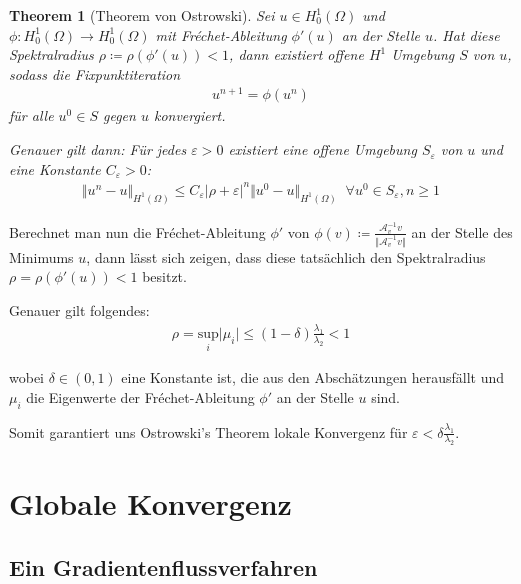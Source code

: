 \documentclass[final,bibliography=totocnumbered]{include/seminar}
\newcommand{\Hone}{\ensuremath{{H^1(\Omega)}}}
\newcommand{\Honez}{\ensuremath{{H^1_0(\Omega)}}}
\newcommand{\mAi}{\ensuremath{\mathcal{A}}^{-1}}
\theoremstyle{break}
\newtheorem{theorem}{Theorem}[section]
\begin{document}
\begin{theorem}[Theorem von Ostrowski]
    Sei $u \in \Honez$ und $\phi: \Honez \rightarrow \Honez$ mit Fréchet-Ableitung $\phi'(u)$ an der Stelle $u$.
    Hat diese Spektralradius $\rho \coloneq \rho(\phi'(u)) < 1$,
    dann existiert offene $H^1$ Umgebung $S$ von $u$, sodass die Fixpunktiteration
    \begin{align*}
        u^{n+1} = \phi(u^n)
    \end{align*}
    für alle $u^0 \in S$ gegen $u$ konvergiert.

    \medskip

    Genauer gilt dann: Für jedes $\varepsilon > 0$ existiert eine offene
    Umgebung $S_\varepsilon$ von $u$ und eine Konstante $C_\varepsilon > 0$:
    \begin{align*}
        \Vert u^n - u \Vert_\Hone \leq C_\varepsilon \vert \rho + \varepsilon \vert^n \Vert u^0 - u \Vert_\Hone\;\; \forall u^0 \in S_\varepsilon, n \geq 1
    \end{align*}
\end{theorem}
\cite{ostrowski-original}
\cite{ostrowski-improved}

\medskip

Berechnet man nun die Fréchet-Ableitung $\phi'$ von
$\phi(v) \coloneq \frac{\mAi_v v}{\Vert \mAi_v v \Vert}$ an der Stelle
des Minimums $u$, dann lässt sich zeigen,
dass diese tatsächlich den Spektralradius
$\rho = \rho(\phi'(u)) < 1$ besitzt.

Genauer gilt folgendes:
\begin{align}
    \rho = \underset{i}{\mathrm{sup}} \vert \mu_i \vert
    \leq (1 - \delta) \frac{\lambda_1}{\lambda_2} < 1
\end{align}

wobei $\delta \in (0, 1)$ eine Konstante ist, die aus den Abschätzungen herausfällt
und $\mu_i$ die Eigenwerte der Fréchet-Ableitung $\phi'$ an der Stelle $u$ sind.

Somit garantiert uns Ostrowski's Theorem lokale Konvergenz für
$\varepsilon < \delta\frac{\lambda_1}{\lambda_2}$.

\section{Globale Konvergenz}

\subsection{Ein Gradientenflussverfahren}
\end{document}
